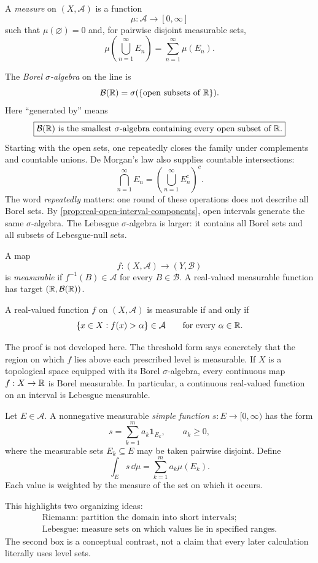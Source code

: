 \begin{definition}[Measure]
A \emph{measure} on $(X,\mathcal A)$ is a function
\[
\mu:\mathcal A\to[0,\infty]
\]
such that $\mu(\varnothing)=0$ and, for pairwise disjoint measurable sets,
\[
\mu\!\left(\bigcup_{n=1}^\infty E_n\right)
=\sum_{n=1}^\infty\mu(E_n).
\]
\end{definition}

The \emph{Borel $\sigma$-algebra} on the line is
\[
\mathcal B(\mathbb{R})=\sigma(\{\text{open subsets of }\mathbb{R}\}).
\]
Here ``generated by'' means
\[
\boxed{\mathcal B(\mathbb{R})\text{ is the smallest $\sigma$-algebra containing
every open subset of }\mathbb{R}.}
\]
Starting with the open sets, one repeatedly closes the family under
complements and countable unions. De Morgan's law also supplies countable
intersections:
\[
\bigcap_{n=1}^\infty E_n
=\left(\bigcup_{n=1}^\infty E_n^c\right)^c.
\]
The word \emph{repeatedly} matters: one round of these operations does not
describe all Borel sets. By \cref{prop:real-open-interval-components}, open
intervals generate the same $\sigma$-algebra. The Lebesgue $\sigma$-algebra
is larger: it contains all Borel sets and all subsets of Lebesgue-null sets.

\begin{definition}
A map
\[
f:(X,\mathcal A)\to(Y,\mathcal B)
\]
is \emph{measurable} if $f^{-1}(B)\in\mathcal A$ for every
$B\in\mathcal B$. A real-valued measurable function has target
$(\mathbb{R},\mathcal B(\mathbb{R}))$.
\end{definition}

\begin{proposition}
\label{prop:measurable-threshold-preview}
A real-valued function $f$ on $(X,\mathcal A)$ is measurable if and only if
\[
\{x\in X:f(x)>\alpha\}\in\mathcal A
\qquad\text{for every }\alpha\in\mathbb{R}.
\]
\end{proposition}
The proof is not developed here. The threshold form says concretely that
the region on which $f$ lies above each prescribed level is measurable.
If $X$ is a topological space equipped with its Borel $\sigma$-algebra, every
continuous map $f:X\to\mathbb{R}$ is Borel measurable. In particular, a continuous
real-valued function on an interval is Lebesgue measurable.

\begin{definition}
Let $E\in\mathcal A$. A nonnegative measurable \emph{simple function}
$s:E\to[0,\infty)$ has the form
\[
s=\sum_{k=1}^m a_k\mathbf1_{E_k},
\qquad a_k\geq0,
\]
where the measurable sets $E_k\subseteq E$ may be taken pairwise disjoint.
Define
\[
\int_Es\,\dd\mu=\sum_{k=1}^ma_k\mu(E_k).
\]
Each value is weighted by the measure of the set on which it occurs.
\end{definition}
This highlights two organizing ideas:
\[
\begin{gathered}
\boxed{\text{Riemann: partition the domain into short intervals;}}\\[2mm]
\boxed{\text{Lebesgue: measure sets on which values lie in specified ranges.}}
\end{gathered}
\]
The second box is a conceptual contrast, not a claim that every later
calculation literally uses level sets.

